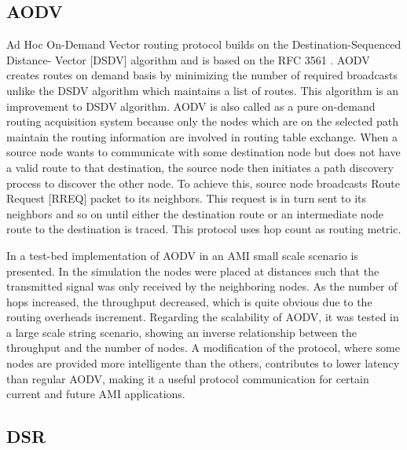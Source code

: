 \documentclass[11pt,final,onecolumn]{IEEEtran}
\begin{document}
\subsection{AODV}\label{aodv}

Ad Hoc On-Demand Vector routing protocol builds on the Destination-Sequenced Distance- Vector [DSDV] algorithm and is based on the RFC 3561 \cite{Perkins2003} . AODV creates routes on demand basis by minimizing the number of required broadcasts unlike the DSDV algorithm which maintains a list of routes. This algorithm is an improvement to DSDV algorithm. AODV  is also called as a pure on-demand routing acquisition system because only the nodes  which are on the selected path maintain the routing information are involved in routing  table exchange.  When a source node wants to communicate with some destination node but does not have a valid route to that destination, the source node then initiates a path discovery process to discover the other node. To achieve this, source node broadcasts Route Request [RREQ] packet to its neighbors. This request is in turn sent to its neighbors and so on until either the destination route or an intermediate node route to the destination is traced. This protocol uses hop count as routing metric.

In \cite{Toimoor2013} a test-bed implementation of AODV in an AMI small scale scenario is presented. In the simulation the nodes were placed at distances such that the transmitted signal was only received by the neighboring nodes. As the number of hops increased, the throughput decreased, which is quite obvious due to the routing overheads increment. Regarding the scalability of AODV, it was tested in a large scale string scenario, showing an inverse relationship between the throughput and the number of nodes. A modification of the protocol, where some nodes are provided more intelligente than the others, contributes to lower latency than regular AODV, making it a useful protocol communication for certain current and future AMI applications.


\subsection{DSR}\label{dsr}
\end{document}
